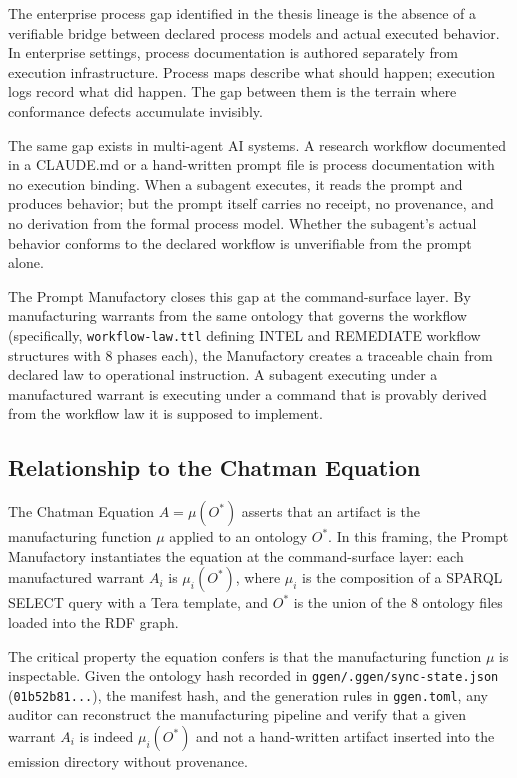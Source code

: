 The enterprise process gap identified in the thesis lineage is the absence of a
verifiable bridge between declared process models and actual executed behavior. In
enterprise settings, process documentation is authored separately from execution
infrastructure. Process maps describe what should happen; execution logs record what
did happen. The gap between them is the terrain where conformance defects accumulate
invisibly.

The same gap exists in multi-agent AI systems. A research workflow documented in a
CLAUDE.md or a hand-written prompt file is process documentation with no execution
binding. When a subagent executes, it reads the prompt and produces behavior; but the
prompt itself carries no receipt, no provenance, and no derivation from the formal
process model. Whether the subagent's actual behavior conforms to the declared workflow
is unverifiable from the prompt alone.

The Prompt Manufactory closes this gap at the command-surface layer. By manufacturing
warrants from the same ontology that governs the workflow (specifically,
\texttt{workflow-law.ttl} defining INTEL and REMEDIATE workflow structures with
8 phases each), the Manufactory creates a traceable chain from declared law to
operational instruction. A subagent executing under a manufactured warrant is executing
under a command that is provably derived from the workflow law it is supposed to
implement.

\subsection{Relationship to the Chatman Equation}
\label{sec:research-prompt-manufactory-lineage-equation}

The Chatman Equation $A = \mu(O^*)$ asserts that an artifact is the manufacturing
function $\mu$ applied to an ontology $O^*$. In this framing, the Prompt Manufactory
instantiates the equation at the command-surface layer: each manufactured warrant $A_i$
is $\mu_i(O^*)$, where $\mu_i$ is the composition of a SPARQL SELECT query with a Tera
template, and $O^*$ is the union of the 8 ontology files loaded into the RDF graph.

The critical property the equation confers is that the manufacturing function $\mu$ is
inspectable. Given the ontology hash recorded in
\texttt{ggen/.ggen/sync-state.json} (\texttt{01b52b81...}), the manifest hash, and the
generation rules in \texttt{ggen.toml}, any auditor can reconstruct the manufacturing
pipeline and verify that a given warrant $A_i$ is indeed $\mu_i(O^*)$ and not a
hand-written artifact inserted into the emission directory without provenance.

